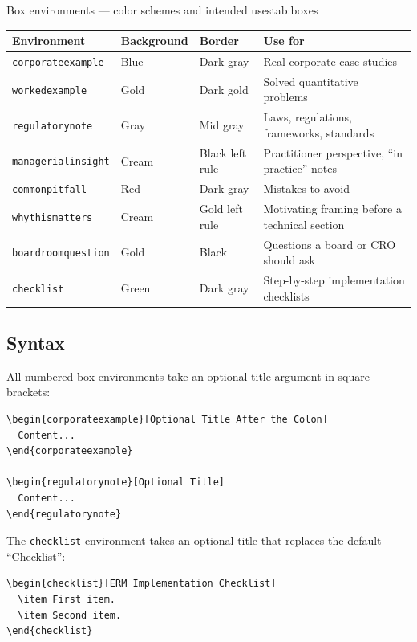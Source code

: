 \documentclass[11pt,openany]{book}
\newcommand{\code}[1]{\texttt{\small #1}}
\begin{document}
\begin{ermtable}{Box environments — color schemes and intended uses}{tab:boxes}
\begin{tabularx}{\linewidth}{lllY}
\toprule
\textbf{Environment} & \textbf{Background} & \textbf{Border} & \textbf{Use for} \\
\midrule
\code{corporateexample}  & Blue       & Dark gray   & Real corporate case studies \\
\code{workedexample}     & Gold       & Dark gold   & Solved quantitative problems \\
\code{regulatorynote}    & Gray       & Mid gray    & Laws, regulations, frameworks, standards \\
\code{managerialinsight} & Cream      & Black left rule & Practitioner perspective, ``in practice'' notes \\
\code{commonpitfall}     & Red        & Dark gray   & Mistakes to avoid \\
\code{whythismatters}    & Cream      & Gold left rule & Motivating framing before a technical section \\
\code{boardroomquestion} & Gold       & Black       & Questions a board or CRO should ask \\
\code{checklist}         & Green      & Dark gray   & Step-by-step implementation checklists \\
\bottomrule
\end{tabularx}
\end{ermtable}

\subsection{Syntax}

All numbered box environments take an optional title argument in square brackets:

\begin{lstlisting}
\begin{corporateexample}[Optional Title After the Colon]
  Content...
\end{corporateexample}

\begin{regulatorynote}[Optional Title]
  Content...
\end{regulatorynote}
\end{lstlisting}

The \code{checklist} environment takes an optional title that replaces the default ``Checklist'':

\begin{lstlisting}
\begin{checklist}[ERM Implementation Checklist]
  \item First item.
  \item Second item.
\end{checklist}
\end{lstlisting}
\end{document}
